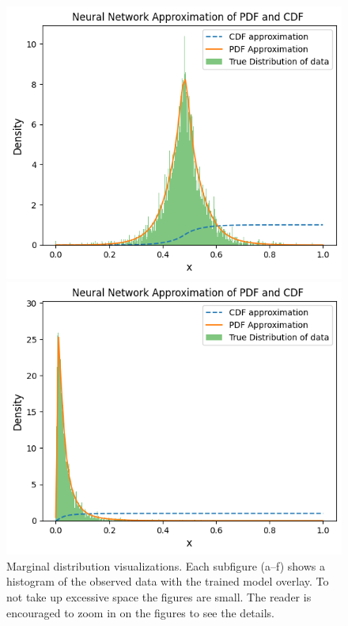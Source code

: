 \begin{figure}[h]
\vspace{1em}

\begin{minipage}{0.49\textwidth}
\centering
\includegraphics[width=\textwidth]{5ResultsDiscussion/pictures/MarginalTest/Laplace.png}
\end{minipage}
\hfill
\begin{minipage}{0.49\textwidth}
\centering
\includegraphics[width=\textwidth]{5ResultsDiscussion/pictures/MarginalTest/Lognormal.png}
\end{minipage}

\caption{Marginal distribution visualizations. Each subfigure (a--f) shows a histogram of the observed data with the trained model overlay. To not take up excessive space the figures are small. The reader is encouraged to zoom in on the figures to see the details.}
\label{fig:MarginalResults}
\end{figure}


